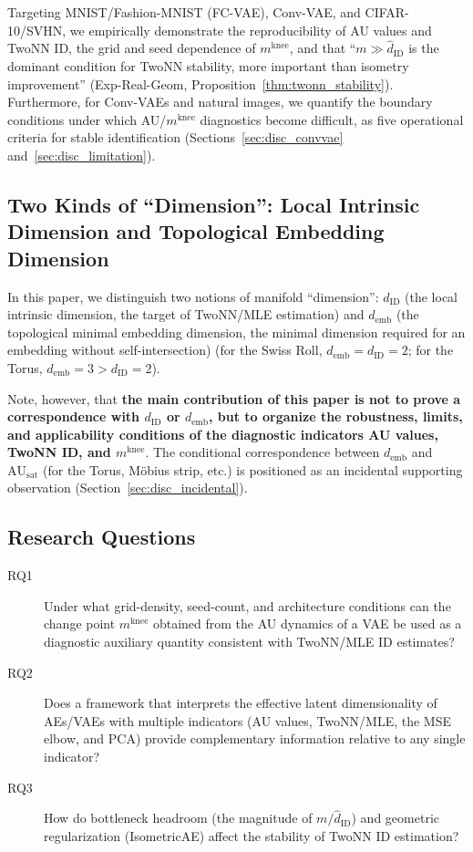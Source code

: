 \documentclass[make,article,submit,pdftex,moreauthors]{Definitions/mdpi}
\newcommand{\dID}{d_{\mathrm{ID}}}
\newcommand{\AUsat}{\mathrm{AU}_{\mathrm{sat}}}
\newcommand{\mknee}{m^{\mathrm{knee}}}
\newcommand{\demb}{d_{\mathrm{emb}}}
\begin{document}
\begin{enumerate}
        Targeting MNIST/Fashion-MNIST (FC-VAE), Conv-VAE, and CIFAR-10/SVHN, we
        empirically demonstrate the reproducibility of AU values and TwoNN ID,
        the grid and seed dependence of $\mknee$, and that
        ``$m \gg \hat{d}_\mathrm{ID}$ is the dominant condition for TwoNN stability,
        more important than isometry improvement''
        (Exp-Real-Geom, Proposition~\ref{thm:twonn_stability}).
        Furthermore, for Conv-VAEs and natural images, we quantify the boundary
        conditions under which AU/$\mknee$ diagnostics become difficult, as five
        operational criteria for stable identification
        (Sections~\ref{sec:disc_convvae} and~\ref{sec:disc_limitation}).
\end{enumerate}

\subsection{Two Kinds of ``Dimension'': Local Intrinsic Dimension and Topological Embedding Dimension}\label{sec:intro_dim}

In this paper, we distinguish two notions of manifold ``dimension'':
$\dID$ (the local intrinsic dimension, the target of TwoNN/MLE estimation) and
$\demb$ (the topological minimal embedding dimension, the minimal dimension
required for an embedding without self-intersection)
(for the Swiss Roll, $\demb = \dID = 2$; for the Torus, $\demb = 3 > \dID = 2$).

Note, however, that \textbf{the main contribution of this paper is not to prove a
correspondence with $\dID$ or $\demb$, but to organize the robustness, limits,
and applicability conditions of the diagnostic indicators AU values, TwoNN ID,
and $\mknee$}.
The conditional correspondence between $\demb$ and $\AUsat$ (for the Torus,
M\"obius strip, etc.) is positioned as an incidental supporting observation
(Section~\ref{sec:disc_incidental}).

\subsection{Research Questions}\label{sec:intro_rq}

\begin{description}
  \item[RQ1] Under what grid-density, seed-count, and architecture conditions can
             the change point $\mknee$ obtained from the AU dynamics of a VAE be
             used as a diagnostic auxiliary quantity consistent with TwoNN/MLE
             ID estimates?
  \item[RQ2] Does a framework that interprets the effective latent dimensionality
             of AEs/VAEs with multiple indicators (AU values, TwoNN/MLE, the MSE
             elbow, and PCA) provide complementary information relative to any
             single indicator?
  \item[RQ3] How do bottleneck headroom (the magnitude of $m / \hat{d}_\mathrm{ID}$)
             and geometric regularization (IsometricAE) affect the stability of
             TwoNN ID estimation?
\end{description}
\end{document}
